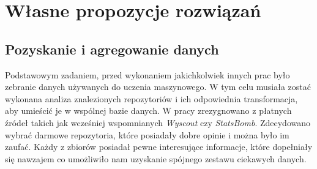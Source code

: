 \chapter{Własne propozycje rozwiązań}
    \section{Pozyskanie i agregowanie danych} \label{data_aggregation}
    \noindent Podstawowym zadaniem, przed wykonaniem jakichkolwiek innych prac było zebranie danych używanych do uczenia maszynowego. W tym celu musiała zostać wykonana analiza znalezionych repozytoriów i ich odpowiednia transformacja, aby umieścić je w wspólnej bazie danych. W pracy zrezygnowano z płatnych źródeł takich jak wcześniej wspomnianych \textit{Wyscout} czy \textit{StatsBomb}. Zdecydowano wybrać darmowe repozytoria, które posiadały dobre opinie i można było im zaufać. Każdy z zbiorów posiadał pewne interesujące informacje, które dopełniały się nawzajem co umożliwiło nam uzyskanie spójnego zestawu ciekawych danych.
